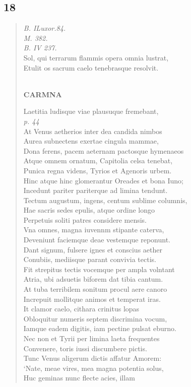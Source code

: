 \documentclass[11pt, a4paper]{report}
\begin{document}
            \subsection*{18}
      \begin{verse}
      \textit{B. ILuxor.84.} \\ \textit{M. 382.} \\ \textit{B. IV 237.} \\ Sol, qui terrarum flammis opera omnia lustrat, \\ Etulit os sacrum caelo tenebrasque resolvit. \\ 
        ﻿\pagebreak 
    \begin{center} \textbf{CARMNA} \end{center} \marginpar{[80]} Laetitia ludisque viae plausuque fremebant, \\ \textit{p. 44} \\ At Venus aetherios inter dea candida nimbos \\ Aurea subnectens exertae cingula mammae, \\ Dona ferens, pacem aeternam pactosque hymenaeos \\ Atque omnem ornatum, Capitolia celsa tenebat, \\ Punica regna videns, Tyrios et Agenoris urbem. \\ Hinc atque hinc glomerantur Oreades et bona Iuno; \\ Incedunt pariter pariterque ad limina tendunt. \\ Tectum augustum, ingens, centum sublime columnis, \\ Hae sacris sedes epulis, atque ordine longo \\ Perpetuis soliti patres considere mensis. \\ Vna omnes, magna iuvennm stipante caterva, \\ Deveniunt faciemque deae vestemque reponunt. \\ Dant signum, fulsere ignes et conscius aether \\ Conubiis, mediisque parant convivia tectis. \\ Fit strepitus tectis vocemque per ampla volntant \\ Atria, ubi adsuetis biforem dat tibia cantum. \\ At tuba terribilem sonitum procul aere canoro \\ Increpuit mollitque animos et temperat iras. \\ It clamor caelo, cithara crinitus lopas \\ Obloquitur numeris septem discrimina vocum, \\ Iamque eadem digitis, iam pectine pulsat eburno. \\ Nec non et Tyrii per limina laeta frequentes \\ Convenere, toris iussi discumbere pictis. \\ Tunc Venus aligerum dictis affatur Amorem: \\ ‘Nate, meae vires, mea magna potentia solus, \\ Huc geminas nunc flecte acies, illam 
\end{verse}
\end{document}
